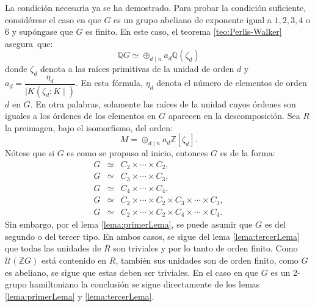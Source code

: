\begin{proof*}
La condición necesaria ya se ha demostrado. Para probar la condición suficiente, considérese el caso en que $G$ es un grupo abeliano de exponente igual a $1,2,3,4$ o $6$ y supóngase que $G$ es finito. En este caso, el teorema \ref{teo:Perlis-Walker} asegura~que: \[ \mathds{Q}G \simeq \oplus_{d \mid n}a_d\mathds{Q}(\zeta_d)  \] donde $\zeta_d$ denota a las raíces primitivas de la unidad de orden $d$ y $a_d = \dfrac{\eta_d}{\mid K(\zeta_d : K \mid)}$. En esta fórmula, $\eta_d$ denota el número de elementos de orden $d$ en $G$. En otra palabras, solamente las raíces de la unidad cuyos órdenes son iguales a los órdenes de los elementos en $G$ aparecen en la descomposición.
Sea $R$ la preimagen, bajo el isomorfismo, del orden: \[ M = \oplus_{d \mid n}a_d \mathds{Z}[\zeta_d].\] Nótese que si $G$ es como se propuso al inicio, entonces $G$ es de la forma: 
\begin{eqnarray*}
G &\simeq& C_2 \times \cdots \times C_2, \\
G &\simeq& C_3 \times \cdots \times C_3, \\
G &\simeq& C_4 \times \cdots \times C_4,  \\
G &\simeq& C_2 \times \cdots \times C_2 \times C_3 \times \cdots \times C_3, \\
G &\simeq& C_2 \times \cdots \times C_2 \times C_4 \times \cdots \times C_4.
\end{eqnarray*}
\indent Sin embargo, por el lema \ref{lema:primerLema}, se puede asumir que $G$ es del segundo o del tercer tipo. En ambos casos, se sigue del lema \ref{lema:tercerLema} que todas las unidades de $R$ son triviales y por lo tanto de orden finito. 
Como $\mathcal{U}(\mathds{Z}G)$ está contenido en $R$, también sus unidades son de orden finito, como $G$ es abeliano, se sigue que estas deben ser triviales.
En el caso en que $G$ es un 2-grupo hamiltoniano la conclusión se sigue directamente de los lemas \ref{lema:primerLema} y \ref{lema:tercerLema}.
\end{proof*}
